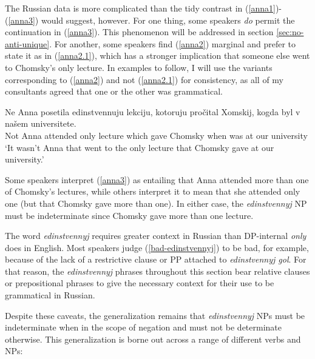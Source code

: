 The Russian data is more complicated than the tidy contrast in (\ref{anna1})-(\ref{anna3}) would suggest, however. For one thing, some speakers \textit{do} permit the continuation in (\ref{anna3}). This phenomenon will be addressed in section \ref{sec:no-anti-unique}. For another, some speakers find (\ref{anna2}) marginal and prefer to state it as in (\ref{anna2.1}), which has a stronger implication that someone else went to Chomsky's only lecture. In examples to follow, I will use the variants corresponding to (\ref{anna2}) and not (\ref{anna2.1}) for consistency, as all of my consultants agreed that one or the other was grammatical.

\begin{exe}
	\ex \label{anna2.1} \gll Ne Anna posetila edinstvennuju lekciju, kotoruju pro\v{c}ital Xomskij, kogda byl v na\v{s}em universitete.\\
	Not Anna attended only lecture which gave Chomsky when was at our university\\
	\glt `It wasn't Anna that went to the only lecture that Chomsky gave at our university.'
\end{exe}

Some speakers interpret (\ref{anna3}) as entailing that Anna attended more than one of Chomsky's lectures, while others interpret it to mean that she attended only one (but that Chomsky gave more than one). In either case, the \textit{edinstvennyj} NP must be indeterminate since Chomsky gave more than one lecture.

The word \textit{edinstvennyj} requires greater context in Russian than DP-internal \textit{only} does in English. Most speakers judge (\ref{bad-edinstvennyj}) to be bad, for example, because of the lack of a restrictive clause or PP attached to \textit{edinstvennyj gol}. For that reason, the \textit{edinstvennyj} phrases throughout this section bear relative clauses or prepositional phrases to give the necessary context for their use to be grammatical in Russian.

\begin{exe}
\end{exe}


Despite these caveats, the generalization remains that \textit{edinstvennyj} NPs must be indeterminate when in the scope of negation and must not be determinate otherwise. This generalization is borne out across a range of different verbs and NPs:

